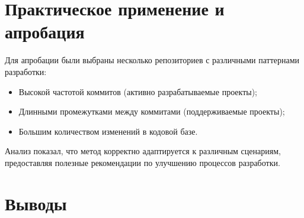 \section{Практическое применение и апробация} \label{ch4:sec3}
Для апробации были выбраны несколько репозиториев с различными паттернами разработки:
\begin{itemize}
	\item Высокой частотой коммитов (активно разрабатываемые проекты);
	\item Длинными промежутками между коммитами (поддерживаемые проекты);
	\item Большим количеством изменений в кодовой базе.
\end{itemize}


Анализ показал, что метод корректно адаптируется к различным сценариям, предоставляя полезные рекомендации по улучшению процессов разработки.

\section{Выводы} \label{ch4:conclusion}
